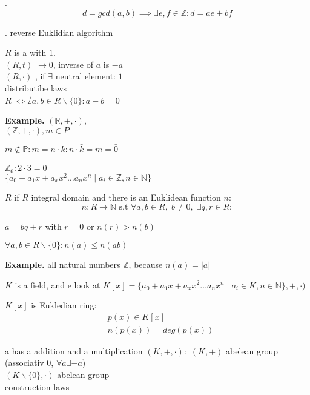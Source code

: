 \Theorem.
\[
  d = gcd(a,b) \implies \exists e,f \in \mathbb{Z}: d = ae + bf
\]

\Proof.
reverse Euklidian algorithm

\begin{definition}
$R$ is a  with $1$. \\
$(R,t)$  $\rightarrow 0$, inverse of $a$ is $-a$\\
$(R,\cdot)$ , if $\exists$ neutral element: $1$ \\
distributibe laws\\
$R$  $\iff \nexists a,b \in R \backslash \{0\}: a-b = 0$
\end{definition}

\textbf{Example.}
$(\mathbb{R}, +, \cdot)$, \\
$(\mathbb{Z}, + , \cdot), m \in P$

$m\not\in \mathbb{P}: m = n \cdot k : \bar{n} \cdot \bar{k} = \bar{m} = \bar{0}$

$\mathbb{Z}_6 : \bar{2} \cdot \bar{3} = \bar{0}$ \\
$\{a_0 + a_1 x + a_x x^2 \ldots a_n x^n \mid a_i \in \mathbb{Z}, n \in \mathbb{N} \}$

\begin{definition}
$R$  if $R$ integral domain and there is an Euklidean function $n$:
\[
  n : R \rightarrow \mathbb{N} \text{ s.t } \forall a,b \in R,\; b \neq 0,\; \exists q,r \in R:
\]

\begin{compactenum}
\item $a = bq + r$ with $r = 0$ or $n(r) > n(b)$
\item $\forall a,b \in R \backslash \{0\} : n(a) \leq n(ab)$
\end{compactenum}
\end{definition}

\textbf{Example.}
all natural numbers $\mathbb{Z}$, because $n(a) = |a|$

$K$ is a field, and e look at $K[x] = 
\{a_0 + a_1 x + a_x x^2 \ldots a_n x^n \mid a_i \in K, n \in \mathbb{N} \}
,+, \cdot )$

$K[x]$ is Eukledian ring:
\begin{align*}
  &p(x) \in K[x] \\
  &n(p(x)) = deg(p(x))
\end{align*}

\begin{definition}
a  has a addition and a multiplication
$(K, +, \cdot):$ 
  $(K,+)$ abelean group (associativ 0, $\forall a \exists -a$) \\
  $(K \backslash \{0\}, \cdot)$ abelean group \\
  construction laws
\end{definition}

